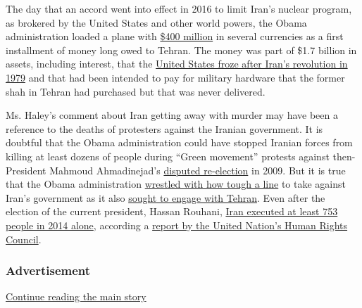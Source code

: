 The day that an accord went into effect in 2016 to limit Iran's nuclear
program, as brokered by the United States and other world powers, the
Obama administration loaded a plane with
\href{https://slack-redir.net/link?url=https\%3A\%2F\%2Fwww.cnn.com\%2F2016\%2F08\%2F03\%2Fpolitics\%2Fus-sends-plane-iran-400-million-cash\%2Findex.html}{\$400
million} in several currencies as a first installment of money long owed
to Tehran. The money was part of \$1.7 billion in assets, including
interest, that the
\href{https://slack-redir.net/link?url=https\%3A\%2F\%2Fwww.nytimes3xbfgragh.onion\%2F2016\%2F08\%2F23\%2Fopinion\%2Fthe-fake-400-million-iran-ransom-story.html}{United
States froze after Iran's revolution in 1979} and that had been intended
to pay for military hardware that the former shah in Tehran had
purchased but that was never delivered.

Ms. Haley's comment about Iran getting away with murder may have been a
reference to the deaths of protesters against the Iranian government. It
is doubtful that the Obama administration could have stopped Iranian
forces from killing at least dozens of people during ``Green movement''
protests against then-President Mahmoud Ahmadinejad's
\href{https://slack-redir.net/link?url=https\%3A\%2F\%2Firanprimer.usip.org\%2Fresource\%2Fgreen-movement}{disputed
re-election} in 2009. But it is true that the Obama administration
\href{https://slack-redir.net/link?url=https\%3A\%2F\%2Fwww.nytimes3xbfgragh.onion\%2F2009\%2F06\%2F18\%2Fus\%2Fpolitics\%2F18prexy.html}{wrestled
with how tough a line} to take against Iran's government as it also
\href{https://slack-redir.net/link?url=https\%3A\%2F\%2Fwww.nytimes3xbfgragh.onion\%2F2009\%2F06\%2F14\%2Fus\%2Fpolitics\%2F14diplo.html}{sought
to engage with Tehran}. Even after the election of the current
president, Hassan Rouhani,
\href{https://slack-redir.net/link?url=https\%3A\%2F\%2Fforeignpolicy.com\%2F2015\%2F03\%2F17\%2Firan-human-rights-nuclear-rouhani\%2F}{Iran
executed at least 753 people in 2014 alone}, according a
\href{https://slack-redir.net/link?url=http\%3A\%2F\%2Fwww.shaheedoniran.org\%2Fwp-content\%2Fuploads\%2F2015\%2F03\%2FA_HRC_28_70_en-PDF.pdf}{report
by the United Nation's Human Rights Council}.

\hypertarget{advertisement-2}{%
\subsubsection{Advertisement}\label{advertisement-2}}

\protect\hyperlink{after-dfp-ad-mid3}{Continue reading the main story}

